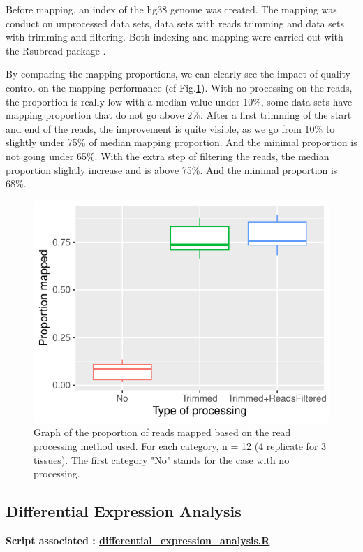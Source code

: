 \documentclass[a4paper, 11pt]{article}
\begin{document}
\begin{multicols}{2}
Before mapping, an index of the hg38 genome was created. The mapping was conduct on unprocessed data sets, data sets with reads trimming and data sets with trimming and filtering. Both indexing and mapping were carried out with the Rsubread package \citep{Rsubread}.

By comparing the mapping proportions, we can clearly see the impact of quality control on the mapping performance (cf Fig.\ref{fig:mapping}). With no processing on the reads, the proportion is really low with a median value under 10\%, some data sets have mapping proportion that do not go above 2\%. After a first trimming of the start and end of the reads, the improvement is quite visible, as we go from 10\% to slightly under 75\% of median mapping proportion. And the minimal proportion is not going under 65\%. With the extra step of filtering the reads, the median proportion slightly increase and is above 75\%. And the minimal proportion is 68\%. 


\begin{figure}[H]
    \centering
    \includegraphics[width=1\columnwidth]{Figures/mapping_props.pdf}
    \caption{\footnotesize{Graph of the proportion of reads mapped based on the read processing method used. For each category, n = 12 (4 replicate for 3 tissues). The first category "No" stands for the case with no processing.}}
    \label{fig:mapping}
\end{figure}


\subsection{Differential Expression Analysis}
\begin{scriptsize}
	\textbf{Script associated : \href{https://github.com/leopoldguyot/BINF-402_Transcriptomic_Project/blob/main/differential_expression_analysis.R}{differential\_expression\_analysis.R}} 
\end{scriptsize}



\end{multicols}
\end{document}

